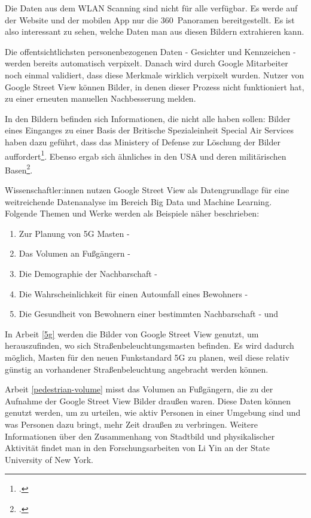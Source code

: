 Die Daten aus dem WLAN Scanning sind nicht für alle verfügbar. Es werde auf der
Website und der mobilen App nur die 360\degree\ Panoramen bereitgestellt. Es ist
also interessant zu sehen, welche Daten man aus diesen Bildern extrahieren kann.

Die offentsichtlichsten personenbezogenen Daten - Gesichter und Kennzeichen -
werden bereits automatisch verpixelt. Danach wird durch Google Mitarbeiter
noch einmal validiert, dass diese Merkmale wirklich verpixelt wurden. Nutzer von
Google Street View können Bilder, in denen dieser Prozess nicht funktioniert
hat, zu einer erneuten manuellen Nachbesserung melden.

In den Bildern befinden sich Informationen, die nicht alle haben sollen: Bilder
eines Einganges zu einer Basis der Britische Spezialeinheit Special Air Services
haben dazu geführt, dass das Ministery of Defense zur Löschung der Bilder
auffordert\footcite{website:bbc:herefordshire}. Ebenso ergab sich ähnliches in
den USA und deren militärischen
Basen\footcite{website:reuters:pentagon-takedown-notice}.

Wissenschaftler:innen nutzen Google Street View als Datengrundlage für eine
weitreichende Datenanalyse im Bereich Big Data und Machine Learning. Folgende
Themen und Werke werden als Beispiele näher beschrieben:

\begin{enumerate}
  \item Zur Planung von 5G Masten - \cite{Zhang_2020}\label{5g}
  \item Das Volumen an Fußgängern - \cite{YIN2015337}\label{pedestrian-volume}
  \item Die Demographie der Nachbarschaft - \cite{Gebru13108}\label{demographics}
  \item Die Wahrscheinlichkeit für einen Autounfall eines Bewohners - \cite{kita2019google}\label{car-accident}
  \item Die Gesundheit von Bewohnern einer bestimmten
  Nachbarschaft - \cite{8933431} und \cite{DBLP:journals/corr/abs-1905-06464}\label{health}
\end{enumerate}

In Arbeit \ref{5g} werden die Bilder von Google Street View genutzt, um
herauszufinden, wo sich Straßenbeleuchtungsmasten befinden. Es wird dadurch
möglich, Masten für den neuen Funkstandard 5G zu planen, weil diese relativ
günstig an vorhandener Straßenbeleuchtung angebracht werden können.

Arbeit \ref{pedestrian-volume} misst das Volumen an Fußgängern, die zu der
Aufnahme der Google Street View Bilder draußen waren. Diese Daten können
genutzt werden, um zu urteilen, wie aktiv Personen in einer Umgebung sind und
was Personen dazu bringt, mehr Zeit draußen zu verbringen. Weitere Informationen
über den Zusammenhang von Stadtbild und physikalischer Aktivität findet man in
den Forschungsarbeiten von Li Yin an der State University of New York.

